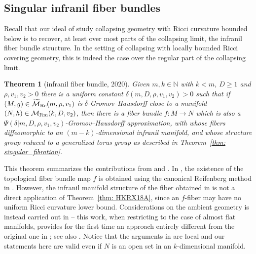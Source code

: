 \documentclass[pdftex]{sigma}
\numberwithin{equation}{section}
\newtheorem{Theorem}{Theorem}[section]
\begin{document}
\subsection{Singular infranil fiber bundles}\label{section3.1}
Recall that our ideal of study collapsing geometry with Ricci curvature bounded
below is to recover, at least over most parts of the collapsing limit, the
infranil fiber bundle structure. In the setting of collapsing with locally
bounded Ricci covering geometry, this is indeed the case over the regular part
of the collapsing limit.
\begin{Theorem}[infranil fiber bundle, 2020] \label{thm: HR20}
Given $m,k\in \mathbb{N}$ with $k<m$, $D\ge 1$ and $\rho,v_1,v_2>0$ there is a
uniform constant $\delta(m,D,\rho, v_1,v_2)>0$ such that if $(M,g)\in
\widetilde{\mathcal{M}}_{\rm Rc}(m,\rho,v_1)$ is $\delta$-Gromov--Hausdorff close to
a manifold $(N,h)\in \mathcal{M}_{\rm Rm}(k,D,v_2)$, then there is a fiber bundle
$f\colon M\to N$ which is also a $\Psi(\delta|m,D,\rho,v_1,v_2)$-Gromov--Hausdorff
approximation, with whose fibers diffeomorphic to an $(m-k)$-dimensional
infranil manifold, and whose structure group reduced to a generalized torus
group as described in Theorem~{\rm \ref{thm: singular_fibration}}.
\end{Theorem}
This theorem summarizes the contributions from \cite{Huang20} and \cite{Rong20}.
In \cite{Huang20}, the existence of the topological fiber bundle map $f$ is
obtained using the canonical Reifenberg method in \cite{CJN18}. However, the
infranil manifold structure of the fiber obtained in \cite{Rong20} is not a
direct application of Theorem~\ref{thm: HKRX18A}, since an $f$-fiber may have no
uniform Ricci curvature lower bound. Considerations on the ambient geometry is
instead carried out in \cite{Rong20} -- this work, when restricting to the
case of almost flat manifolds, provides for the first time an approach entirely
different from the original one in \cite{Gromov78b, Ruh82}; see also
\cite{Rong19}. Notice that the arguments in \cite{Huang20, Rong20} are local
and our statements here are valid even if $N$ is an open set in an
$k$-dimensional manifold.
\end{document}
